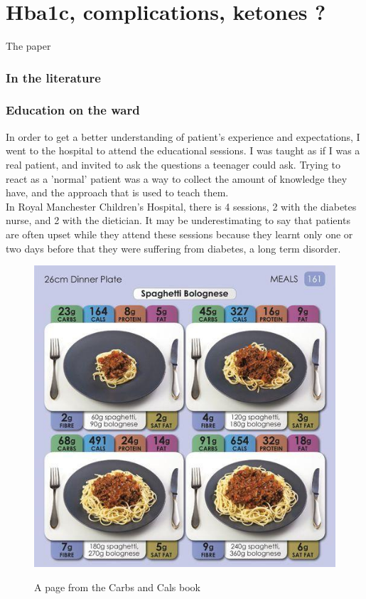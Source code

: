 \section{Hba1c, complications, ketones ?}
The paper
~\cite{HBA1Ckilpatrick2012rise}

\subsubsection{In the literature}
\subsubsection{Education on the ward}
In order to get a better understanding of patient's experience and expectations, I went to the hospital to attend the educational sessions. I was taught as if I was a real patient, and invited to ask the questions a teenager could ask. Trying to react as a 'normal' patient was a way to collect the amount of knowledge they have, and the approach that is used to teach them.
\\In Royal Manchester Children’s Hospital, there is 4 sessions, 2 with the diabetes nurse, and 2 with the dietician. It may be underestimating to say that patients are often upset while they attend these sessions because they learnt only one or two days before that they were suffering from diabetes, a long term disorder.



\begin{figure}[h]
  \caption{A page from the Carbs and Cals book}
  \centering
  \includegraphics[scale=0.9]{bookImage}
  \label{fig:bookImage}
\end{figure}



